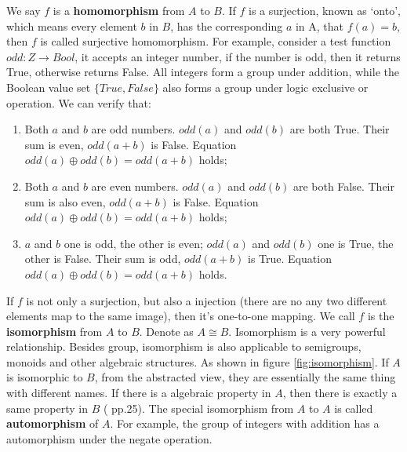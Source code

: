 \documentclass[b5paper]{article}
\begin{document}
We say $f$ is a \textbf{homomorphism} from $A$ to $B$. If $f$ is a surjection, known as `onto', which means every element $b$ in $B$, has the corresponding $a$ in A, that $f(a) = b$, then $f$ is called surjective homomorphism. For example, consider a test function $odd: Z \to Bool$, it accepts an integer number, if the number is odd, then it returns True, otherwise returns False. All integers form a group under addition, while the Boolean value set $\{True, False\}$ also forms a group under logic exclusive or operation. We can verify that:

\begin{enumerate}
\item Both $a$ and $b$ are odd numbers. $odd(a)$ and $odd(b)$ are both True. Their sum is even, $odd(a+b)$ is False. Equation $odd(a) \oplus odd(b) = odd(a+b)$ holds;
\item Both $a$ and $b$ are even numbers. $odd(a)$ and $odd(b)$ are both False. Their sum is also even, $odd(a+b)$ is False. Equation $odd(a) \oplus odd(b) = odd(a+b)$ holds;
\item $a$ and $b$ one is odd, the other is even; $odd(a)$ and $odd(b)$ one is True, the other is False. Their sum is odd, $odd(a+b)$ is True. Equation $odd(a) \oplus odd(b) = odd(a+b)$ holds.
\end{enumerate}

If $f$ is not only a surjection, but also a injection (there are no any two different elements map to the same image), then it's one-to-one mapping. We call $f$ is the \textbf{isomorphism} from $A$ to $B$. Denote as $A \cong B$. Isomorphism is a very powerful relationship. Besides group, isomorphism is also applicable to semigroups, monoids and other algebraic structures. As shown in figure \ref{fig:isomorphism}. If $A$ is isomorphic to $B$, from the abstracted view, they are essentially the same thing with different names. If there is a algebraic property in $A$, then there is exactly a same property in $B$ (\cite{ZhangHeRui1978} pp.25). The special isomorphism from $A$ to $A$ is called \textbf{automorphism} of $A$. For example, the group of integers with addition has a automorphism under the negate operation.

\end{document}
